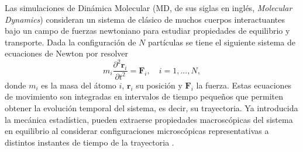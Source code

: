 Las simulaciones de Dinámica Molecular (MD, de sus siglas en inglés, 
\textit{Molecular Dynamics}) consideran un sistema de clásico de muchos cuerpos 
interactuantes bajo un campo de fuerzas newtoniano para estudiar propiedades de 
equilibrio y transporte. Dada la configuración de $N$ partículas se tiene el 
siguiente sistema de ecuaciones de Newton por resolver
\begin{equation}
    m_i \frac{\partial^2 \mathbf{r}_i}{\partial t^2} = \mathbf{F}_i, \quad i = 1,..., N,
\end{equation}
donde $m_i$ es la masa del átomo $i$, $\mathbf{r}_i$ su posición y $\mathbf{F}_i$
la fuerza. Estas ecuaciones de movimiento son integradas en intervalos de tiempo
pequeños que permiten obtener la evolución temporal del sistema, es decir, su
trayectoria. Ya introducida la mecánica estadística, pueden extraerse propiedades
macroscópicas del sistema en equilibrio al considerar configuraciones microscópicas
representativas a distintos instantes de tiempo de la trayectoria
\cite{allen2017, frenkel2001}.

